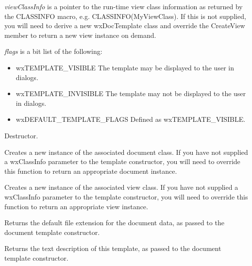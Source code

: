 {\it viewClassInfo} is a pointer to the run-time view class information as returned
by the CLASSINFO macro, e.g. CLASSINFO(MyViewClass). If this is not supplied,
you will need to derive a new wxDocTemplate class and override the CreateView
member to return a new view instance on demand.

{\it flags} is a bit list of the following:

\begin{itemize}\itemsep=0pt
\item wxTEMPLATE\_VISIBLE The template may be displayed to the user in dialogs.
\item wxTEMPLATE\_INVISIBLE The template may not be displayed to the user in dialogs.
\item wxDEFAULT\_TEMPLATE\_FLAGS Defined as wxTEMPLATE\_VISIBLE.
\end{itemize}



Destructor.



Creates a new instance of the associated document class. If you have not supplied
a wxClassInfo parameter to the template constructor, you will need to override this
function to return an appropriate document instance.



Creates a new instance of the associated view class. If you have not supplied
a wxClassInfo parameter to the template constructor, you will need to override this
function to return an appropriate view instance.



Returns the default file extension for the document data, as passed to the document template constructor.



Returns the text description of this template, as passed to the document template constructor.

